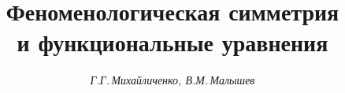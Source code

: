 






\newcommand{\la}{\langle}


\newcommand{\ra}{\rangle}


\newcommand{\grad}{\operatorname{grad}}


\newcommand{\ufm}{\underline{\frak M}}


\newcommand{\tts}[1]{}


\renewcommand{\baselinestretch}{1.05}







\setcounter{page}{77}















\author{\it Г.Г.\,Михайличенко, В.М.\,Малышев}




\title{Феноменологическая симметрия\\ и функциональные уравнения }





\date{}




\pagestyle{plain} %







\maketitle


